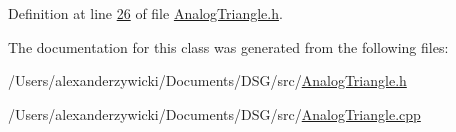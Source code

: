Definition at line \hyperlink{_analog_triangle_8h_source_l00026}{26} of file \hyperlink{_analog_triangle_8h_source}{Analog\+Triangle.\+h}.



The documentation for this class was generated from the following files\+:\begin{DoxyCompactItemize}
\item 
/\+Users/alexanderzywicki/\+Documents/\+D\+S\+G/src/\hyperlink{_analog_triangle_8h}{Analog\+Triangle.\+h}\item 
/\+Users/alexanderzywicki/\+Documents/\+D\+S\+G/src/\hyperlink{_analog_triangle_8cpp}{Analog\+Triangle.\+cpp}\end{DoxyCompactItemize}
